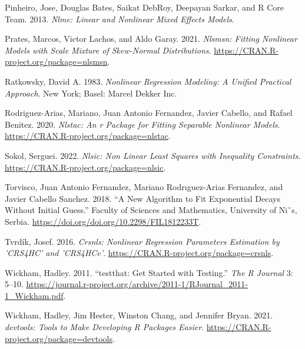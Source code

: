 \begin{CSLReferences}{1}{0}
\leavevmode{}%
Pinheiro, Jose, Douglas Bates, Saikat DebRoy, Deepayan Sarkar, and R Core Team. 2013. \emph{Nlme: Linear and Nonlinear Mixed Effects Models}.

\leavevmode{}%
Prates, Marcos, Victor Lachos, and Aldo Garay. 2021. \emph{Nlsmsn: Fitting Nonlinear Models with Scale Mixture of Skew-Normal Distributions}. \url{https://CRAN.R-project.org/package=nlsmsn}.

\leavevmode{}%
Ratkowsky, David A. 1983. \emph{Nonlinear Regression Modeling: A Unified Practical Approach}. New York; Basel: Marcel Dekker Inc.

\leavevmode{}%
Rodriguez-Arias, Mariano, Juan Antonio Fernandez, Javier Cabello, and Rafael Benitez. 2020. \emph{Nlstac: An r Package for Fitting Separable Nonlinear Models}. \url{https://CRAN.R-project.org/package=nlstac}.

\leavevmode{}%
Sokol, Serguei. 2022. \emph{Nlsic: Non Linear Least Squares with Inequality Constraints}. \url{https://CRAN.R-project.org/package=nlsic}.

\leavevmode{}%
Torvisco, Juan Antonio Fernandez, Mariano Rodrıguez-Arias Fernandez, and Javier Cabello Sanchez. 2018. {``A New Algorithm to Fit Exponential Decays Without Initial Guess.''} {Faculty of Sciences and Mathematics, University of Niˇs, Serbia}. \url{https://doi.org/doi.org/10.2298/FIL1812233T}.

\leavevmode{}%
Tvrdík, Josef. 2016. \emph{Crsnls: Nonlinear Regression Parameters Estimation by 'CRS4HC' and 'CRS4HCe'}. \url{https://CRAN.R-project.org/package=crsnls}.

\leavevmode{}%
Wickham, Hadley. 2011. {``{testthat: Get Started with Testing}.''} \emph{The R Journal} 3: 5--10. \url{https://journal.r-project.org/archive/2011-1/RJournal_2011-1_Wickham.pdf}.

\leavevmode{}%
Wickham, Hadley, Jim Hester, Winston Chang, and Jennifer Bryan. 2021. \emph{{devtools: Tools to Make Developing R Packages Easier}}. \url{https://CRAN.R-project.org/package=devtools}.

\end{CSLReferences}

